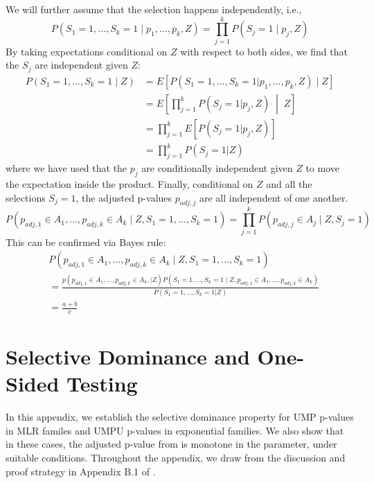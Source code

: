 \documentclass{article}
\begin{document}
\begin{appendix}
We will further assume that the selection happens independently, i.e., 
\begin{equation*}
    P(S_1 = 1, \dots, S_k = 1 \mid p_1, \dots, p_k, Z) = \prod_{j = 1}^k P(S_j = 1 \mid p_j, Z)
\end{equation*} 
By taking expectations conditional on $Z$ with respect to both sides, we find that the $S_j$ are independent given $Z$:
\begin{align*}
    P(S_1 = 1, \dots, S_k = 1 \mid Z) &= E[P(S_1 = 1, \dots, S_k = 1 | p_1, \dots, p_k, Z) \mid Z] \\
    &= E \left[\prod_{j = 1}^k P(S_j = 1 | p_j, Z) \;\middle|\; Z\right]\\
    &= \prod_{j=1}^k E[P(S_j = 1 | p_j, Z)]\\
    &= \prod_{j=1}^k P(S_j = 1 | Z)
\end{align*}
where we have used that the $p_j$ are conditionally independent given $Z$ to move the expectation inside the product. Finally, conditional on $Z$ and all the selections $S_j=1$, the adjusted p-values $p_{adj, j}$ are all independent of one another. 
\begin{equation*}
    P(p_{adj, 1} \in A_1, \dots, p_{adj, k} \in A_k \mid Z, S_1 = 1, \dots, S_k = 1) = \prod_{j=1}^k P(p_{adj, j} \in A_j \mid Z, S_j = 1)
\end{equation*}
This can be confirmed via Bayes rule:
\begin{align*}
    &P(p_{adj, 1} \in A_1, \dots, p_{adj, k} \in A_k \mid Z, S_1 = 1, \dots, S_k = 1) \\
    &= \frac{p(p_{adj, 1} \in A_1, \dots, p_{adj, k} \in A_k, | Z) P( S_1 = 1, \dots, S_k = 1 \mid Z, p_{adj, 1} \in A_1, \dots, p_{adj, k} \in A_k)  }{P(S_1=1, \dots, S_k = 1 | Z)}\\
    &= \frac{a + b}{c}
\end{align*}

\section{Selective Dominance and One-Sided Testing}
\label{sec:one_sided_appdx}

In this appendix, we establish the selective dominance property for UMP p-values in MLR familes and UMPU p-values in exponential families. We also show that in these cases, the adjusted p-value from  is monotone in the parameter, under suitable conditions. Throughout the appendix, we draw from the discussion and proof strategy in Appendix B.1 of \cite{Lei}.


\end{appendix}
\end{document}
